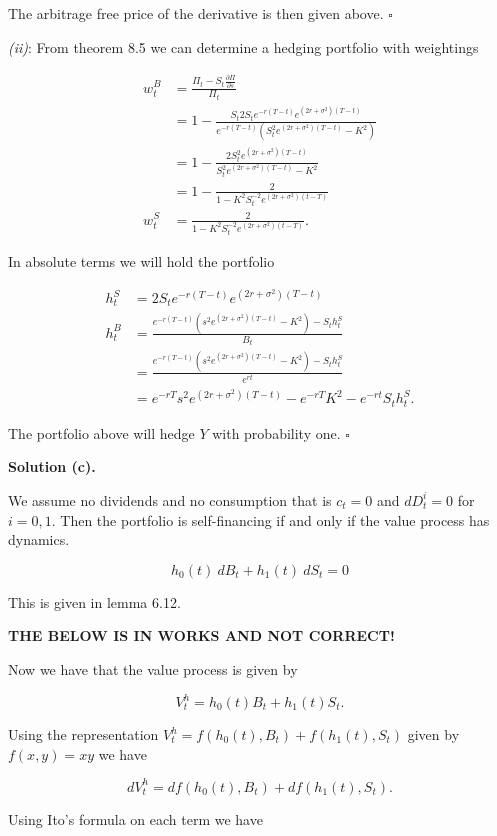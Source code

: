 \documentclass[
]{book}
\begin{document}
The arbitrage free price of the derivative is then given above. \(\square\)

\emph{(ii)}: From theorem 8.5 we can determine a hedging portfolio with weightings

\begin{align*}
w_t^B&=\frac{\Pi_t-S_t\frac{\partial\Pi}{\partial s}}{\Pi_t}\\
&=1-\frac{S_t2S_te^{-r(T-t)}e^{(2r+\sigma^2)(T-t)}}{e^{-r(T-t)}\left(S_t^2e^{(2r+\sigma^2)(T-t)}-K^2\right)}\\
&=1-\frac{2S_t^2e^{(2r+\sigma^2)(T-t)}}{S_t^2e^{(2r+\sigma^2)(T-t)}-K^2}\\
&=1-\frac{2}{1-K^2S_t^{-2}e^{(2r+\sigma^2)(t-T)}}\\
w_t^S&=\frac{2}{1-K^2S_t^{-2}e^{(2r+\sigma^2)(t-T)}}.
\end{align*}

In absolute terms we will hold the portfolio

\begin{align*}
h_t^S&=2S_te^{-r(T-t)}e^{(2r+\sigma^2)(T-t)}\\
h_t^B&=\frac{e^{-r(T-t)}\left(s^2e^{(2r+\sigma^2)(T-t)}-K^2\right)-S_th_t^S}{B_t}\\
&=\frac{e^{-r(T-t)}\left(s^2e^{(2r+\sigma^2)(T-t)}-K^2\right)-S_th_t^S}{e^{rt}}\\
&=e^{-rT}s^2e^{(2r+\sigma^2)(T-t)}-e^{-rT}K^2-e^{-rt}S_th_t^S.
\end{align*}

The portfolio above will hedge \(Y\) with probability one. \(\square\)

\textbf{Solution (c).}

We assume no dividends and no consumption that is \(c_t=0\) and \(dD_t^i=0\) for \(i=0,1\). Then the portfolio is self-financing if and only if the value process has dynamics.

\[
h_0(t)\ dB_t+h_1(t)\ dS_t=0
\]

This is given in lemma 6.12.

\textbf{THE BELOW IS IN WORKS AND NOT CORRECT!}

Now we have that the value process is given by

\[
V_t^h=h_0(t)B_t+h_1(t)S_t.
\]

Using the representation \(V_t^h=f(h_0(t),B_t)+f(h_1(t),S_t)\) given by \(f(x,y)=xy\) we have

\[
dV_t^h=df(h_0(t),B_t)+df(h_1(t),S_t).
\]

Using Ito's formula on each term we have
\end{document}
